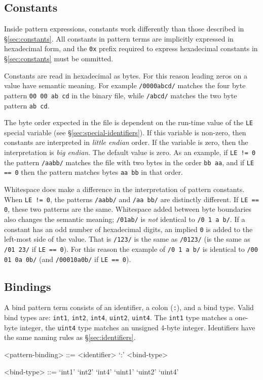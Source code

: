 \subsection{Constants}
\label{sec:pattern-constants}
Inside pattern expressions, constants work differently than those described in \S\ref{sec:constants}.  All constants in pattern terms are implicitly expressed in hexadecimal form, and the \texttt{0x} prefix required to express hexadecimal constants in \S\ref{sec:constants} must be ommitted.

Constants are read in hexadecimal as bytes.  For this reason leading zeros on a value have semantic meaning.  For example \texttt{/0000abcd/} matches the four byte pattern \texttt{00 00 ab cd} in the binary file, while \texttt{/abcd/} matches the two byte pattern \texttt{ab cd}.

The byte order expected in the file is dependent on the run-time value of the \texttt{LE} special variable (see \S\ref{sec:special-identifiers}).  If this variable is non-zero, then constants are interpreted in \textsl{little endian} order.  If the variable is zero, then the interpretation is \textsl{big endian}.  The default value is zero.  As an example, if \texttt{LE != 0} the pattern \texttt{/aabb/} matches the file with two bytes in the order \texttt{bb aa}, and if \texttt{LE == 0} then the pattern matches bytes \texttt{aa bb} in that order.

Whitespace does make a difference in the interpretation of pattern constants.  When \texttt{LE != 0}, the patterns \texttt{/aabb/} and \texttt{/aa bb/} are distinctly different.  If \texttt{LE == 0}, these two patterns are the same.  Whitespace added between byte boundaries also changes the semantic meaning; \texttt{/01ab/} is \emph{not} identical to \texttt{/0 1 a b/}.  If a constant has an odd number of hexadecimal digits, an implied \texttt{0} is added to the left-most side of the value.  That is \texttt{/123/} is the same as \texttt{/0123/} (is the same as \texttt{/01 23/} if \texttt{LE == 0}).  For this reason the example of \texttt{/0 1 a b/} is identical to \texttt{/00 01 0a 0b/} (and \texttt{/00010a0b/} if \texttt{LE == 0}).
 
\subsection{Bindings}
\label{sec:pattern-bindings}
A bind pattern term consists of an identifier, a colon (\texttt{:}), and a bind type.  Valid bind types are: \texttt{int1}, \texttt{int2}, \texttt{int4}, \texttt{uint2}, \texttt{uint4}.  The \texttt{int1} type matches a one-byte integer, the \texttt{uint4} type matches an unsigned 4-byte integer.  Identifiers have the same naming rules as \S\ref{sec:identifiers}.
\begin{grammar}
<pattern-binding> ::= <identifier> `:' <bind-type>

<bind-type> ::= `int1'
\alt `int2'
\alt `int4'
\alt `uint1'
\alt `uint2'
\alt `uint4'
\end{grammar}

